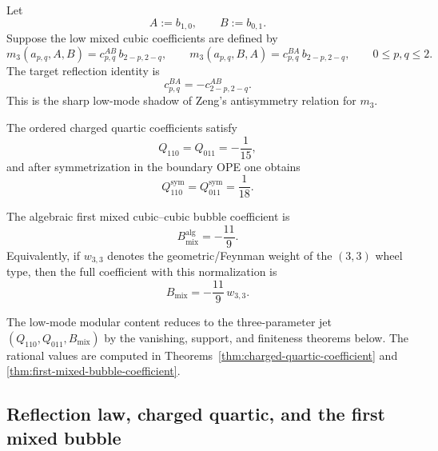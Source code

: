 \begin{remark}
\label{rem:low-mixed-cubic-reflection-target}
Let
\[
A:=b_{1,0},
\qquad
B:=b_{0,1}.
\]
Suppose the low mixed cubic coefficients are defined by
\[
m_3(a_{p,q},A,B)=c^{AB}_{p,q}\,b_{2-p,2-q},
\qquad
m_3(a_{p,q},B,A)=c^{BA}_{p,q}\,b_{2-p,2-q},
\qquad 0\le p,q\le 2.
\]
The target reflection identity is
\[
c^{BA}_{p,q}=-c^{AB}_{2-p,2-q}.
\]
This is the sharp low-mode shadow of Zeng's antisymmetry relation for $m_3$.
\end{remark}

\begin{remark}
\label{rem:explicit-charged-quartic-jet-target}
The ordered charged quartic coefficients satisfy
\[
Q_{110}=Q_{011}=-\frac1{15},
\]
and after symmetrization in the boundary OPE one obtains
\[
Q_{110}^{\mathrm{sym}}=Q_{011}^{\mathrm{sym}}=\frac1{18}.
\]
\end{remark}

\begin{remark}
\label{rem:first-mixed-bubble-coefficient-target}
The algebraic first mixed cubic--cubic bubble coefficient is
\[
B_{\mathrm{mix}}^{\mathrm{alg}}=-\frac{11}{9}.
\]
Equivalently, if $w_{3,3}$ denotes the geometric/Feynman weight of the $(3,3)$ wheel type,
then the full coefficient with this normalization is
\[
B_{\mathrm{mix}}=-\frac{11}{9}\,w_{3,3}.
\]
\end{remark}

\begin{remark}
\label{rem:low-mode-coefficient-proof-obligations}
The low-mode modular content reduces to the three-parameter jet
$(Q_{110},Q_{011},B_{\mathrm{mix}})$ by the vanishing, support, and
finiteness theorems below. The rational values are computed in
Theorems~\ref{thm:charged-quartic-coefficient} and
\ref{thm:first-mixed-bubble-coefficient}.
\end{remark}

\subsection{Reflection law, charged quartic, and the first mixed bubble}
\label{subsec:low-mode-data-derivation}

